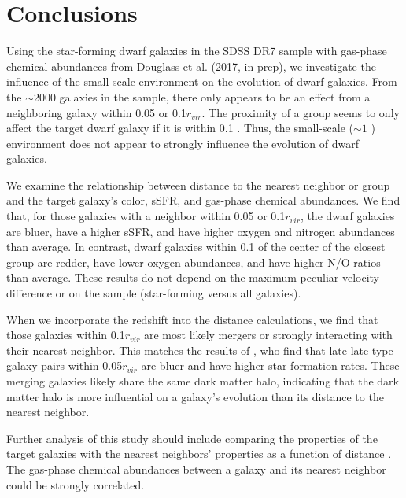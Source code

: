 

\section[Conclusions]{Conclusions}

Using the star-forming dwarf galaxies in the SDSS DR7 sample with gas-phase 
chemical abundances from Douglass et al. (2017, in prep), we investigate the 
influence of the small-scale environment on the evolution of dwarf galaxies.  
From the $\sim$2000 galaxies in the sample, there only appears to be an effect 
from a neighboring galaxy within 0.05 \hMpc or 0.1$r_{vir}$.  The proximity of a 
group seems to only affect the target dwarf galaxy if it is within 0.1 \hMpc.  
Thus, the small-scale ($\sim 1$ \hMpc) environment does not appear to strongly 
influence the evolution of dwarf galaxies.

We examine the relationship between distance to the nearest neighbor or group 
and the target galaxy's color, sSFR, and gas-phase chemical abundances.  We find 
that, for those galaxies with a neighbor within 0.05 \hMpc or 0.1$r_{vir}$, the 
dwarf galaxies are bluer, have a higher sSFR, and have higher oxygen and 
nitrogen abundances than average.  In contrast, dwarf galaxies within 0.1 \hMpc 
of the center of the closest group are redder, have lower oxygen abundances, and 
have higher N/O ratios than average.  These results do not depend on the maximum 
peculiar velocity difference or on the sample (star-forming versus all 
galaxies).

When we incorporate the redshift into the distance calculations, we find that 
those galaxies within 0.1$r_{vir}$ are most likely mergers or strongly 
interacting with their nearest neighbor.  This matches the results of 
\cite{Park09}, who find that late-late type galaxy pairs within 0.05$r_{vir}$ 
are bluer and have higher star formation rates.  These merging galaxies likely 
share the same dark matter halo, indicating that the dark matter halo is more 
influential on a galaxy's evolution than its distance to the nearest neighbor.

Further analysis of this study should include comparing the properties of the 
target galaxies with the nearest neighbors' properties as a function of 
distance \citep[``galactic conformity'';][]{Weinmann06}.  The gas-phase chemical 
abundances between a galaxy and its nearest neighbor could be strongly 
correlated.